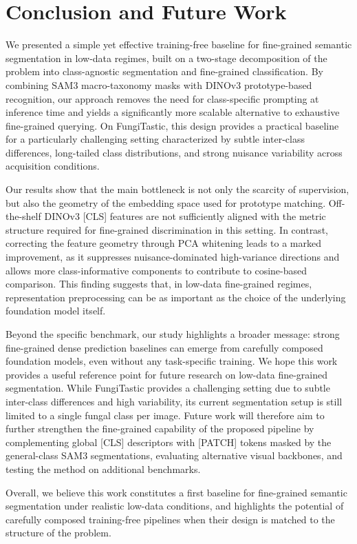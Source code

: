 \section{Conclusion and Future Work}
We presented a simple yet effective training-free baseline for fine-grained semantic segmentation in low-data regimes, built on a two-stage decomposition of the problem into class-agnostic segmentation and fine-grained classification. By combining SAM3 macro-taxonomy masks with DINOv3 prototype-based recognition, our approach removes the need for class-specific prompting at inference time and yields a significantly more scalable alternative to exhaustive fine-grained querying. On FungiTastic, this design provides a practical baseline for a particularly challenging setting characterized by subtle inter-class differences, long-tailed class distributions, and strong nuisance variability across acquisition conditions.

Our results show that the main bottleneck is not only the scarcity of supervision, but also the geometry of the embedding space used for prototype matching. Off-the-shelf DINOv3 [CLS] features are not sufficiently aligned with the metric structure required for fine-grained discrimination in this setting. In contrast, correcting the feature geometry through PCA whitening leads to a marked improvement, as it suppresses nuisance-dominated high-variance directions and allows more class-informative components to contribute to cosine-based comparison. This finding suggests that, in low-data fine-grained regimes, representation preprocessing can be as important as the choice of the underlying foundation model itself.

Beyond the specific benchmark, our study highlights a broader message: strong fine-grained dense prediction baselines can emerge from carefully composed foundation models, even without any task-specific training. We hope this work provides a useful reference point for future research on low-data fine-grained segmentation. While FungiTastic provides a challenging setting due to subtle inter-class differences and high variability, its current segmentation setup is still limited to a single fungal class per image. Future work will therefore aim to further strengthen the fine-grained capability of the proposed pipeline by complementing global [CLS] descriptors with [PATCH] tokens masked by the general-class SAM3 segmentations, evaluating alternative visual backbones, and testing the method on additional benchmarks.

Overall, we believe this work constitutes a first baseline for fine-grained semantic segmentation under realistic low-data conditions, and highlights the potential of carefully composed training-free pipelines when their design is matched to the structure of the problem.